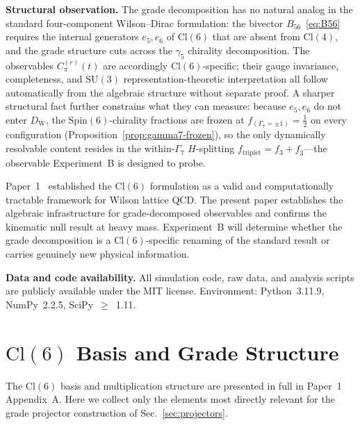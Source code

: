 \documentclass[12pt]{article}
\theoremstyle{definition}
\theoremstyle{remark}
\newcommand{\cl}{\mathrm{Cl}}           %
\newcommand{\spin}{\mathrm{Spin}}       %
\newcommand{\su}{\mathrm{SU}}           %
\newcommand{\dW}{D_{\mathrm{W}}}        %
\newcommand{\half}{\tfrac{1}{2}}
\newcommand{\GaSeven}{\Gamma_7}                      %
\newcommand{\ftriplet}{f_{\mathrm{triplet}}}          %
\begin{document}
	\noindent\textbf{Structural observation.}  The grade decomposition has no
	natural analog in the standard four-component Wilson--Dirac formulation: the
	bivector $B_{56}$~\eqref{eq:B56} requires the internal generators $e_5, e_6$
	of $\cl(6)$ that are absent from $\cl(4)$, and the grade structure cuts
	across the $\gamma_5$ chirality decomposition.  The observables
	$C_\pi^{(r)}(t)$ are accordingly $\cl(6)$-specific; their gauge invariance,
	completeness, and $\su(3)$ representation-theoretic interpretation all follow
	automatically from the algebraic structure without separate proof.  A sharper
	structural fact further constrains what they can measure: because $e_5,e_6$ do
	not enter $\dW$, the $\spin(6)$-chirality fractions are frozen at
	$f_{(\GaSeven=\pm1)}=\half$ on every configuration
	(Proposition~\ref{prop:gamma7-frozen}), so the only dynamically resolvable
	content resides in the within-$\GaSeven$ $H$-splitting
	$\ftriplet = f_3 + f_{\bar 3}$---the observable Experiment~B is designed to
	probe.
	
	Paper~1~\cite{FirestoneP1} established the $\cl(6)$ formulation as a valid
	and computationally tractable framework for Wilson lattice QCD.  The present
	paper establishes the algebraic infrastructure for grade-decomposed observables
	and confirms the kinematic null result at heavy mass.  Experiment~B will
	determine whether the grade decomposition is a $\cl(6)$-specific renaming of
	the standard result or carries genuinely new physical information.
	
	\medskip
	\noindent\textbf{Data and code availability.}  All simulation code, raw data,
	and analysis scripts are publicly available under the MIT license.
	Environment: Python~3.11.9, NumPy~2.2.5,
	SciPy~$\geq$~1.11.
	
	\appendix
	\renewcommand{\thetable}{\Alph{section}.\arabic{table}}
	
	\section{\texorpdfstring{$\cl(6)$}{Cl(6)} Basis and Grade Structure}
	\label{app:A}
	
	The $\cl(6)$ basis and multiplication structure are presented in full in
	Paper~1~\cite{FirestoneP1} Appendix~A.  Here we collect only the elements
	most directly relevant for the grade projector construction of
	Sec.~\ref{sec:projectors}.
	
\end{document}
